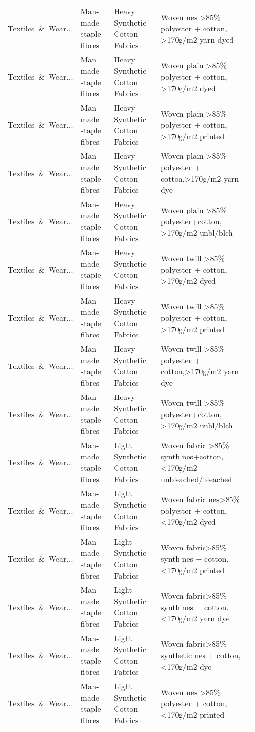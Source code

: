 \begin{appendices}
\begin{xltabular}{\textwidth}{|p{0.10\textwidth}|p{0.25\textwidth}|p{0.24\textwidth}|p{0.31\textwidth}|}
Textiles\ \&\ Wear... & Man-made staple fibres & Heavy Synthetic Cotton Fabrics & Woven nes >85\% polyester + cotton, >170g/m2 yarn dyed \\
Textiles\ \&\ Wear... & Man-made staple fibres & Heavy Synthetic Cotton Fabrics & Woven plain >85\% polyester + cotton, >170g/m2 dyed \\
Textiles\ \&\ Wear... & Man-made staple fibres & Heavy Synthetic Cotton Fabrics & Woven plain >85\% polyester + cotton, >170g/m2 printed \\
Textiles\ \&\ Wear... & Man-made staple fibres & Heavy Synthetic Cotton Fabrics & Woven plain >85\% polyester + cotton,>170g/m2 yarn dye \\
Textiles\ \&\ Wear... & Man-made staple fibres & Heavy Synthetic Cotton Fabrics & Woven plain >85\% polyester+cotton, >170g/m2 unbl/blch \\
Textiles\ \&\ Wear... & Man-made staple fibres & Heavy Synthetic Cotton Fabrics & Woven twill >85\% polyester + cotton, >170g/m2 dyed \\
Textiles\ \&\ Wear... & Man-made staple fibres & Heavy Synthetic Cotton Fabrics & Woven twill >85\% polyester + cotton, >170g/m2 printed \\
Textiles\ \&\ Wear... & Man-made staple fibres & Heavy Synthetic Cotton Fabrics & Woven twill >85\% polyester + cotton,>170g/m2 yarn dye \\
Textiles\ \&\ Wear... & Man-made staple fibres & Heavy Synthetic Cotton Fabrics & Woven twill >85\% polyester+cotton, >170g/m2 unbl/blch \\
Textiles\ \&\ Wear... & Man-made staple fibres & Light Synthetic Cotton Fabrics & Woven fabric >85\% synth nes+cotton,<170g/m2 unbleached/bleached \\
Textiles\ \&\ Wear... & Man-made staple fibres & Light Synthetic Cotton Fabrics & Woven fabric nes>85\% polyester + cotton,<170g/m2 dyed \\
Textiles\ \&\ Wear... & Man-made staple fibres & Light Synthetic Cotton Fabrics & Woven fabric>85\% synth nes + cotton, <170g/m2 printed \\
Textiles\ \&\ Wear... & Man-made staple fibres & Light Synthetic Cotton Fabrics & Woven fabric>85\% synth nes + cotton,<170g/m2 yarn dye \\
Textiles\ \&\ Wear... & Man-made staple fibres & Light Synthetic Cotton Fabrics & Woven fabric>85\% synthetic nes + cotton, <170g/m2 dye \\
Textiles\ \&\ Wear... & Man-made staple fibres & Light Synthetic Cotton Fabrics & Woven nes >85\% polyester + cotton, <170g/m2 printed \\

\end{xltabular}
\end{appendices}
